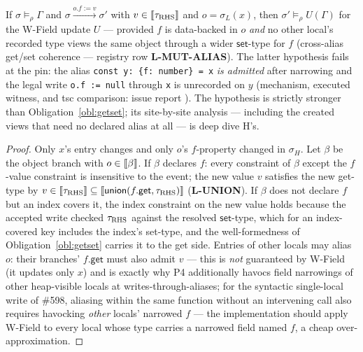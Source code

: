 \documentclass[11pt]{article}
\newcommand{\Env}{\Gamma}
\begin{document}
\begin{lemma}
\label{lem:rewiden-sound}
If $\sigma \models_\rho \Env$ and $\sigma \xrightarrow{o.f := v} \sigma'$
with $v \in \llbracket \tau_{\rm RHS} \rrbracket$ and $o = \sigma_L(x)$, then
$\sigma' \models_\rho U(\Env)$ for the W-Field update $U$ — provided $f$
is data-backed in $o$ \emph{and} no other local's recorded type views the
same object through a wider $\mathsf{set}$-type for $f$ (cross-alias
get/set coherence — registry row \textbf{L-MUT-ALIAS}). The latter
hypothesis fails at the pin: the alias
\texttt{const y:\ \{f:\ number\} = x} \emph{is admitted} after narrowing
and the legal write \texttt{o.f := null} through \texttt{x} is
unrecorded on $y$ (mechanism, executed witness, and tsc comparison:
issue report ). The
hypothesis is strictly stronger than Obligation~\ref{obl:getset}; its
site-by-site analysis — including the created views that need no declared
alias at all — is deep dive H's.
\end{lemma}
\begin{proof}
Only $x$'s entry changes and only $o$'s $f$-property changed in
$\sigma_H$. Let $\beta$ be the object branch with $o \in \llbracket \beta \rrbracket$.
If $\beta$ declares $f$: every constraint of $\beta$ except the $f$-value
constraint is insensitive to the event; the new value $v$ satisfies the
new get-type by $v \in \llbracket \tau_{\rm RHS} \rrbracket \subseteq
\llbracket \mathsf{union}(f.\mathsf{get}, \tau_{\rm RHS}) \rrbracket$ (\textbf{L-UNION}).
If $\beta$ does not declare $f$ but an index covers it, the index
constraint on the new value holds because the accepted write checked
$\tau_{\rm RHS}$ against the resolved $\mathsf{set}$-type, which for an
index-covered key includes the index's set-type, and the well-formedness
of Obligation~\ref{obl:getset} carries it to the get side. Entries of
other locals may alias $o$: their branches' $f.\mathsf{get}$ must also
admit $v$ — this is \emph{not} guaranteed by W-Field (it updates only
$x$) and is exactly why P4 additionally havocs field narrowings of other
heap-visible locals at writes-through-aliases; for the syntactic
single-local write of \#598, aliasing within the same function without an
intervening call also requires havocking \emph{other} locals' narrowed
$f$ — the implementation should apply W-Field to every local whose type
carries a narrowed field named $f$, a cheap over-approximation.
\end{proof}
\end{document}
